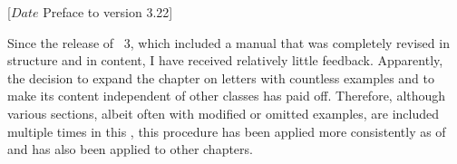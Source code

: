 %
%
%
%
%
%
%
%
%

                 [$Date$
                  Preface to version 3.22]



Since the release of \KOMAScript{}~3, which included a manual that was
completely revised in structure and in content, I have received relatively
little feedback. Apparently, the decision to expand the chapter on letters
with countless examples and to make its content independent of other classes
has paid off. Therefore, although various sections, albeit often with modified
or omitted examples, are included multiple times in this
, this procedure has been applied more consistently as of
 and has also been applied to
other chapters.


